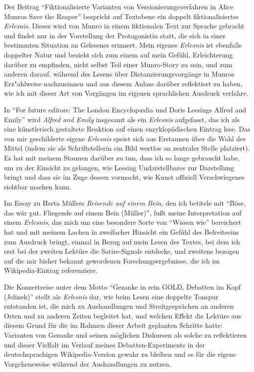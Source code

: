 \documentclass[fontsize=12pt]{scrartcl}
\begin{document}
Der Beitrag "`Fiktionalisierte Varianten von Versionierungsverfahren in Alice Munros \flq Save the Reaper\frq"' bespricht auf Textebene ein doppelt fiktionalisiertes \textit{Erlesnis}. Dieses wird von Munro in einem fiktionalen Text zur Sprache gebracht und findet nur in der Vorstellung der Protagonistin\textsuperscript{\tiny *} statt, die sich in einer bestimmten Si\-tu\-a\-tion an Ge\-le\-se\-nes erinnert. Mein eigenes \textit{Erlesnis} ist ebenfalls doppelter Natur und bezieht sich zum einem auf mein Gef\"uhl, Erleichterung dar\"uber zu empfinden, nicht \mbox{selbst} Teil einer Munro-Story zu sein, und zum anderen darauf, w\"ahrend des Lesens \"uber Distanzierungsvorg\"ange in Munros Erz"ahlweise nachzusinnen und aus diesem Anlass dar\"uber reflektiert zu haben, wie ich mit dieser Art von Vorg\"angen im eigenen sprachlichen Ausdruck verfahre.

In "`\flq For future editors\frq: \flq The London Encyclop{\ae}dia\frq \,\,und Doris Lessings \flq Alfred and Emily\frq"' wird \textit{Alfred and Emily} insgesamt als ein \textit{Erlesnis} aufgefasst, das ich als eine k\"unstlerisch gestaltete Reaktion auf einen enzy\-klop\"adischen Eintrag lese. Das von mir geschilderte eigene \textit{Erlesnis} speist sich aus Erstaunen \"uber die Wahl der Mittel (indem sie als Schriftstellerin ein Bild wortlos an zentraler Stelle platziert). Es hat mit meinem Staunen dar\"uber zu tun, dass ich so lange gebraucht habe, um zu der Einsicht zu gelangen, wie Lessing Undarstellbares zur Darstellung bringt und dass sie im Zuge dessen vormacht, wie Kunst offiziell Verschwiegenes sichtbar machen kann.

Im Essay zu Herta M\"ullers \textit{Reisende auf einem Bein}, den ich betitele mit "`\flq B\"ose, das w\"ar gut\frq . Fliegende auf einem Bein (M\"uller)"', fu{\ss}t meine Interpretation auf einem \textit{Erlesnis}, das mich um eine besondere Sorte von "`Wissen wie"' bereichert hat und mit meinem Lachen in zweifacher Hinsicht ein Gef\"uhl des Befreitseins zum Ausdruck bringt, einmal in Bezug auf mein Lesen des Textes, bei dem ich erst bei der zwei\-ten Lekt\"ure die Satire-Signale entdecke, und zwei\-tens bezogen auf die mir bis\-her bekannt gewordenen For\-schungsergebnisse, die ich im Wi\-ki\-pe\-dia-Eintrag referenziere.

Die Konzertreise unter dem Motto "`Gezanke in \flq rein GOLD\frq, Debatten im Kopf (Jelinek)"' stellt als \textit{Erlesnis} dar, wie beim Lesen eine doppelte Tonspur entstanden ist, die mich zu Aushandlungen und Streitgespr\"achen an anderen Orten und zu anderen Zei\-ten begleitet hat, und welchen Effekt die Lekt\"ure aus diesem Grund f\"ur die im Rahmen dieser Arbeit geplanten Schritte hatte: Varianten von Gezanke und seinen m\"oglichen Diskursen als solche zu reflektieren und dieser Vielfalt im Verlauf meines Debatten-Experiments in der deutschspra\-chi\-gen Wi\-ki\-pe\-dia-Version gewahr zu bleiben und es f\"ur die eigene Vorgehensweise w\"ahrend der Aushandlungen zu nutzen. 
\end{document}
